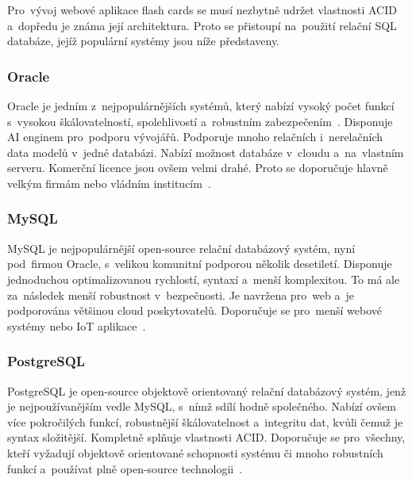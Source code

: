 \documentclass[twoside]{ctuthesis}
\begin{document}
Pro~vývoj webové aplikace flash cards se musí nezbytně udržet vlastnosti ACID a~dopředu je známa její architektura. Proto se přistoupí na~použití relační SQL databáze, jejíž populární systémy jsou níže představeny.

\subsubsection*{Oracle}

Oracle je jedním z~nejpopulárnějších systémů, který nabízí vysoký počet funkcí s~vysokou škálovatelností, spolehlivostí a~robustním zabezpečením~\cite{databases}. Disponuje AI enginem pro~podporu vývojářů. Podporuje mnoho relačních i~nerelačních data modelů v~jedné databázi. Nabízí možnost databáze v~cloudu a~na~vlastním serveru. Komerční licence jsou ovšem velmi drahé. Proto se doporučuje hlavně velkým firmám nebo vládním institucím~\cite{altex, oracle}.

\subsubsection*{MySQL}

MySQL je nejpopulárnější open-source relační databázový systém, nyní pod~firmou Oracle, s~velikou komunitní podporou několik desetiletí. Disponuje jednoduchou optimalizovanou rychlostí, syntaxí a~menší komplexitou. To má ale za~následek menší robustnost v~bezpečnosti. Je navržena pro~web a~je podporována většinou cloud poskytovatelů. Doporučuje se pro~menší webové systémy nebo IoT aplikace~\cite{altex, mysql}.

%
%
%
\subsubsection*{PostgreSQL}

PostgreSQL je open-source objektově orientovaný relační databázový systém, jenž je nejpoužívanějším vedle MySQL, s~nímž sdílí hodně společného. Nabízí ovšem více pokročilých funkcí, robustnější škálovatelnost a~integritu dat, kvůli čemuž je syntax složitější. Kompletně splňuje vlastnosti ACID. Doporučuje se pro~všechny, kteří vyžadují objektově orientované schopnosti systému či mnoho robustních funkcí a~používat plně open-source technologii~\cite{databases, postgre}. 
\end{document}
